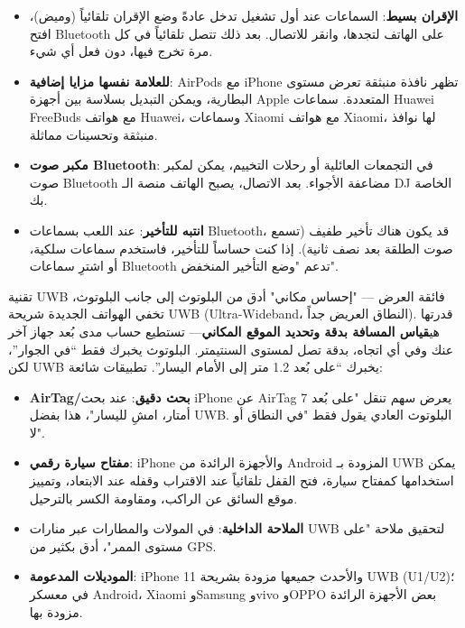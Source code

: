 \begin{itemize}
  \item \textbf{الإقران بسيط}: السماعات عند أول تشغيل تدخل عادةً وضع الإقران تلقائياً (وميض)، افتح Bluetooth على الهاتف لتجدها، وانقر للاتصال. بعد ذلك تتصل تلقائياً في كل مرة تخرج فيها، دون فعل أي شيء.
  \item \textbf{للعلامة نفسها مزايا إضافية}: AirPods مع iPhone تظهر نافذة منبثقة تعرض مستوى البطارية، ويمكن التبديل بسلاسة بين أجهزة Apple المتعددة. سماعات Huawei FreeBuds مع هواتف Huawei، وسماعات Xiaomi مع هواتف Xiaomi، لها نوافذ منبثقة وتحسينات مماثلة.
  \item \textbf{مكبر صوت Bluetooth}: في التجمعات العائلية أو رحلات التخييم، يمكن لمكبر صوت Bluetooth مضاعفة الأجواء. بعد الاتصال، يصبح الهاتف منصة الـ DJ الخاصة بك.
  \item \textbf{انتبه للتأخير}: عند اللعب بسماعات Bluetooth، قد يكون هناك تأخير طفيف (تسمع صوت الطلقة بعد نصف ثانية). إذا كنت حساساً للتأخير، فاستخدم سماعات سلكية، أو اشترِ سماعات Bluetooth تدعم "وضع التأخير المنخفض".
\end{itemize}

\begin{tcbinfo}{تقنية UWB فائقة العرض — "إحساس مكاني" أدق من البلوتوث}
إلى جانب البلوتوث، تخفي الهواتف الجديدة شريحة UWB (Ultra-Wideband، النطاق العريض جداً). قدرتها هي\textbf{قياس المسافة بدقة وتحديد الموقع المكاني}— تستطيع حساب مدى بُعد جهاز آخر عنك وفي أي اتجاه، بدقة تصل لمستوى السنتيمتر. البلوتوث يخبرك فقط “في الجوار”، لكن UWB يخبرك “على بُعد 1.2 متر إلى الأمام اليسار”. تطبيقات شائعة:

\begin{itemize}
  \item \textbf{AirTag/بحث دقيق}: عند بحث iPhone عن AirTag يعرض سهم تنقل "على بُعد 7 أمتار، امشِ لليسار"، هذا بفضل UWB. البلوتوث العادي يقول فقط "في النطاق أو لا".
  \item \textbf{مفتاح سيارة رقمي}: iPhone والأجهزة الرائدة من Android المزودة بـ UWB يمكن استخدامها كمفتاح سيارة، فتح القفل تلقائياً عند الاقتراب وقفله عند الابتعاد، وتمييز موقع السائق عن الراكب، ومقاومة الكسر بالترحيل.
  \item \textbf{الملاحة الداخلية}: في المولات والمطارات عبر منارات UWB لتحقيق ملاحة "على مستوى الممر"، أدق بكثير من GPS.
  \item \textbf{الموديلات المدعومة}: iPhone 11 والأحدث جميعها مزودة بشريحة UWB (U1/U2)؛ في معسكر Android، Xiaomi وSamsung وvivo وOPPO بعض الأجهزة الرائدة مزودة بها.
\end{itemize}

\end{tcbinfo}

